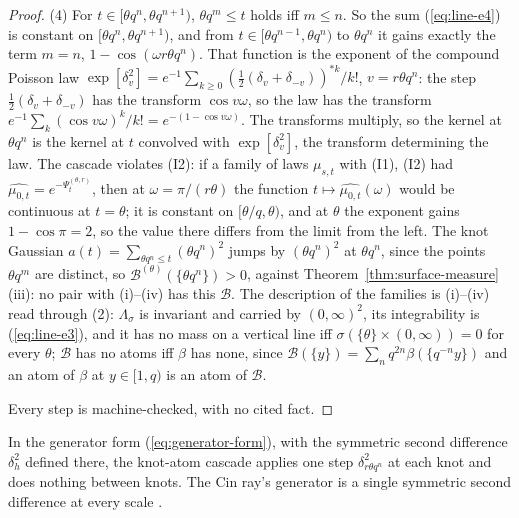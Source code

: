 \begin{proof}
(4) For $t \in [\theta q^n, \theta q^{n+1})$, $\theta q^m \le t$ holds iff $m \le n$. So the sum
(\ref{eq:line-e4}) is constant on $[\theta q^n, \theta q^{n+1})$, and from $t \in [\theta q^{n-1}, \theta q^n)$
to $\theta q^n$ it gains exactly the term $m = n$, $1 - \cos(\omega r\theta q^n)$. That function is
the exponent of the compound Poisson law
$\exp[\delta^2_v] = e^{-1}\sum_{k \ge 0}(\tfrac12(\delta_v + \delta_{-v}))^{*k}/k!$, $v = r\theta q^n$:
the step $\tfrac12(\delta_v + \delta_{-v})$ has the transform $\cos v\omega$, so the law has the
transform $e^{-1}\sum_k(\cos v\omega)^k/k! = e^{-(1 - \cos v\omega)}$. The transforms multiply, so
the kernel at $\theta q^n$ is the kernel at $t$ convolved with $\exp[\delta^2_v]$, the transform
determining the law. The cascade violates (I2): if a family of laws $\mu_{s,t}$ with (I1), (I2) had
$\widehat{\mu_{0,t}} = e^{-\Psi^{(\theta,r)}_t}$, then at $\omega = \pi/(r\theta)$ the function
$t \mapsto \widehat{\mu_{0,t}}(\omega)$ would be continuous at $t = \theta$; it is constant on
$[\theta/q, \theta)$, and at $\theta$ the exponent gains $1 - \cos\pi = 2$, so the value there differs
from the limit from the left. The knot Gaussian $a(t) = \sum_{\theta q^n \le t}(\theta q^n)^2$
jumps by $(\theta q^n)^2$ at $\theta q^n$, since the points $\theta q^m$ are distinct, so
$\mathcal{B}^{(\theta)}(\{\theta q^n\}) > 0$, against Theorem~\ref{thm:surface-measure}(iii): no pair
with (i)--(iv) has this $\mathcal{B}$. The description of the families is (i)--(iv) read through
(2): $\Lambda_\sigma$ is invariant and carried by $(0,\infty)^2$, its integrability is (\ref{eq:line-e3}), and it
has no mass on a vertical line iff $\sigma(\{\theta\} \times (0,\infty)) = 0$ for every $\theta$;
$\mathcal{B}$ has no atoms iff $\beta$ has none, since
$\mathcal{B}(\{y\}) = \sum_nq^{2n}\beta(\{q^{-n}y\})$ and an atom of $\beta$ at $y \in [1,q)$ is an
atom of $\mathcal{B}$.

Every step is machine-checked, with no cited fact.
\end{proof}

In the generator form (\ref{eq:generator-form}), with the symmetric second difference
$\delta^2_h$ defined there, the knot-atom cascade applies one step $\delta^2_{r\theta q^n}$ at each
knot and does nothing between knots. The Cin ray's generator is a single symmetric second
difference at every scale .

